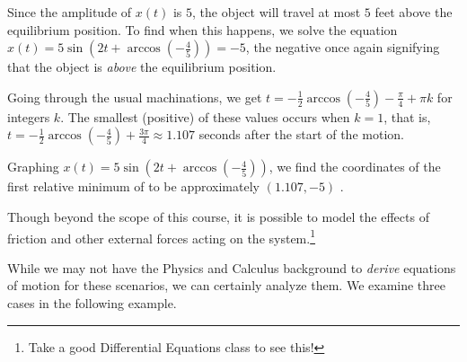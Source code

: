 \documentclass{ximera}
\begin{document}
\begin{example}
\begin{explanation}
\begin{enumerate}
 

Since the amplitude of $x(t)$ is $5$, the object will travel at most $5$ feet above the equilibrium position.  To find when this happens, we solve the equation $x(t)= 5 \sin\left(2t +\arccos\left( -\frac{4}{5} \right) \right)= -5$, the negative once again signifying that the object is \textit{above} the equilibrium position.  

 

Going through the usual machinations, we get $t = -\frac{1}{2} \arccos\left( -\frac{4}{5} \right)-\frac{\pi}{4}  + \pi k$ for integers $k$. The smallest (positive) of these values occurs when $k=1$, that is, $t =-\frac{1}{2} \arccos\left( -\frac{4}{5} \right)+ \frac{3\pi}{4}  \approx 1.107$ seconds after the start of the motion. 

 

Graphing $x(t) = 5 \sin\left(2t +  \arccos\left( -\frac{4}{5} \right) \right)$, we find the coordinates of the first relative minimum of to be approximately $(1.107,-5)$ .


\begin{center}
\end{center}


\end{enumerate}
\end{explanation}
\end{example}

Though beyond the scope of this course, it is possible  to model the effects of friction and other external forces acting on the system.\footnote{Take a good Differential Equations class to see this!}  

 

While we may not have the Physics and Calculus background to \textit{derive} equations of motion for these scenarios, we can certainly analyze them.  We examine three cases in the following example.

\newpage
\end{document}
